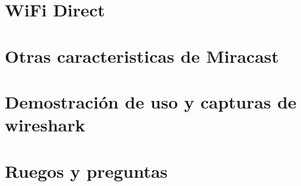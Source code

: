 \documentclass{beamer}
\begin{document}




\section{WiFi Direct}




\section{Otras caracteristicas de Miracast}



\section{Demostración de uso y capturas de wireshark}





\section{Ruegos y preguntas}




\end{document}
